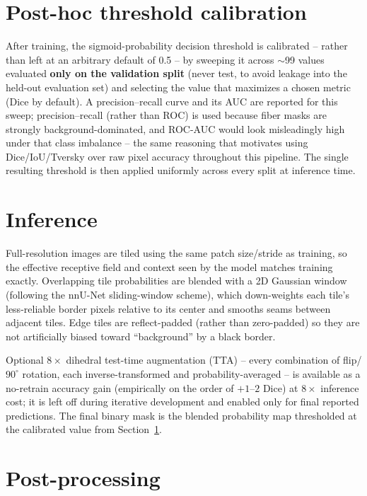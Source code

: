 \documentclass[11pt]{article}
\begin{document}
\section{Post-hoc threshold calibration}
\label{sec:calibration}

After training, the sigmoid-probability decision threshold is calibrated --
rather than left at an arbitrary default of 0.5 -- by sweeping it across
$\sim$99 values evaluated \textbf{only on the validation split} (never test,
to avoid leakage into the held-out evaluation set) and selecting the value
that maximizes a chosen metric (Dice by default). A precision--recall curve
and its AUC are reported for this sweep; precision--recall (rather than ROC)
is used because fiber masks are strongly background-dominated, and ROC-AUC
would look misleadingly high under that class imbalance -- the same
reasoning that motivates using Dice/IoU/Tversky over raw pixel accuracy
throughout this pipeline. The single resulting threshold is then applied
uniformly across every split at inference time.

\section{Inference}

Full-resolution images are tiled using the same patch size/stride as
training, so the effective receptive field and context seen by the model
matches training exactly. Overlapping tile probabilities are blended with a
2D Gaussian window (following the nnU-Net sliding-window scheme), which
down-weights each tile's less-reliable border pixels relative to its center
and smooths seams between adjacent tiles. Edge tiles are reflect-padded
(rather than zero-padded) so they are not artificially biased toward
``background'' by a black border.

Optional $8\times$ dihedral test-time augmentation (TTA) -- every combination
of flip/$90^\circ$ rotation, each inverse-transformed and
probability-averaged -- is available as a no-retrain accuracy gain
(empirically on the order of $+1$--$2$ Dice) at $8\times$ inference cost; it
is left off during iterative development and enabled only for final reported
predictions. The final binary mask is the blended probability map
thresholded at the calibrated value from Section~\ref{sec:calibration}.

\section{Post-processing}
\end{document}
